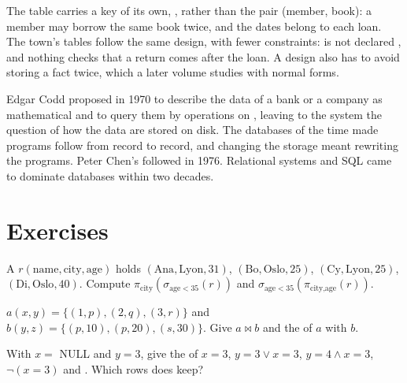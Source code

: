 The  table carries a key of its own, , rather than the pair (member, book): a member may borrow
the same book twice, and the dates belong to each loan. The town's tables follow the same design, with fewer
constraints:  is not declared , and nothing checks that a return comes after the
loan. A design also has to avoid storing a fact twice, which a later volume studies with normal forms.

\begin{history}
Edgar Codd proposed in 1970 to describe the data of a bank or a company as mathematical  and to query them by
operations on , leaving to the system the question of how the data are stored on disk. The databases of the
time made programs follow  from record to record, and changing the storage meant rewriting the programs. Peter
Chen's  followed in 1976. Relational systems and SQL came to dominate databases within two
decades.
\end{history}

\section{Exercises}\label{sec:b1:relational-model:exercises}

\begin{exercise}[$\star$]\label{exo:b1:relational-model:1}
A  $r(\text{name}, \text{city}, \text{age})$ holds $(\text{Ana}, \text{Lyon}, 31)$, $(\text{Bo}, \text{Oslo},
25)$, $(\text{Cy}, \text{Lyon}, 25)$, $(\text{Di}, \text{Oslo}, 40)$. Compute $\pi_{\text{city}}(\sigma_{\text{age} <
35}(r))$ and $\sigma_{\text{age} < 35}(\pi_{\text{city}, \text{age}}(r))$.
\end{exercise}

\begin{exercise}[$\star$]\label{exo:b1:relational-model:2}
$a(x, y) = \{(1, p), (2, q), (3, r)\}$ and $b(y, z) = \{(p, 10), (p, 20), (s, 30)\}$. Give $a \bowtie b$ and the  of $a$ with $b$.
\end{exercise}

\begin{exercise}[$\star$]\label{exo:b1:relational-model:3}
With $x = $ NULL and $y = 3$, give the  of $x = 3$, $y = 3 \vee x = 3$, $y = 4 \wedge x = 3$, $\neg(x = 3)$
and . Which rows does  keep?
\end{exercise}

